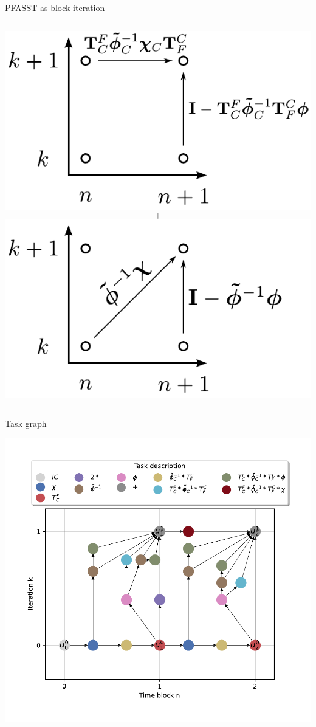 \documentclass[11pt,aspectratio=43]{beamer}
\begin{document}
\begin{frame}{PFASST as block iteration}
\begin{columns}
		\centering
		\includegraphics[width=\linewidth]{kn-approxCGC.pdf}
		$$\textbf{+}$$
		\includegraphics[width=\linewidth]{kn-approxBlockJacobi.pdf}\vspace{-20pt}
	\end{columns}
\end{frame}

\begin{frame}{Task graph}
	\begin{center}
    	\includegraphics[width=0.6\linewidth]{PFASSTTaskGraph.pdf}
    \end{center}
\end{frame}
\end{document}
